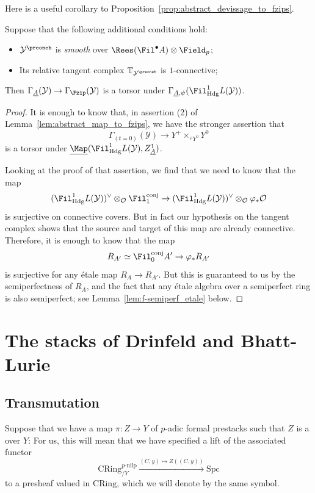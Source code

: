 \documentclass[10pt]{amsart}
\begin{document}
Here is a useful corollary to Proposition~\ref{prop:abstract_devissage_to_fzips}.
\begin{corollary}
\label{cor:abstract_fzip_smooth_torsor}
Suppose that the following additional conditions hold:
\begin{itemize}
   \item $\mathcal{Y}^\preoneb$ is \emph{smooth} over $\Rees(\Fil^\bullet A)\otimes\Field_p$;
   \item Its relative tangent complex $\mathbb{T}_{\mathcal{Y}^\preoneb}$ is $1$-connective;
\end{itemize}
Then $\Gamma_{\underline{A}}(\mathcal{Y})\to \Gamma_{\Fzip}(\mathcal{Y})$ is a torsor under $\Gamma_{\underline{A},\psi}(\Fil^1_{\mathrm{Hdg}}L(\mathcal{Y}))$.
\end{corollary}   
\begin{proof}
It is enough to know that, in assertion (2) of Lemma~\ref{lem:abstract_map_to_fzips}, we have the stronger assertion that
\[
\Gamma_{(t=0)}(\mathcal{Y})\to Y^+\times_{{}^\varphi Y^0}Y^0
\]
is a torsor under $\underline{\Map}(\Fil^1_{\mathrm{Hdg}}L(\mathcal{Y}),Z^1_{\underline{A}})$.

Looking at the proof of that assertion, we find that we need to know that the map
\[
(\Fil^1_{\mathrm{Hdg}}L(\mathcal{Y}))^\vee\otimes_{\mathcal{O}}\Fil^{\mathrm{conj}}_1\to (\Fil^1_{\mathrm{Hdg}}L(\mathcal{Y}))^\vee\otimes_{\mathcal{O}}\varphi_*\mathcal{O}
\]
is surjective on connective covers. But in fact our hypothesis on the tangent complex shows that the source and target of this map are already connective. Therefore, it is enough to know that the map
\[
R_{A'}\simeq \Fil^{\mathrm{conj}}_0A'\to \varphi_*R_{A'}
\]
is surjective for any \'etale map $R_A\to R_{A'}$. But this is guaranteed to us by the semiperfectness of $R_A$, and the fact that any \'etale algebra over a semiperfect ring is also semiperfect; see Lemma~\ref{lem:f-semiperf_etale} below.
\end{proof}


\section{The stacks of Drinfeld and Bhatt-Lurie}
\label{sec:bld_stacks}


\subsection{Transmutation}
\label{subsec:transmutation}

Suppose that we have a map $\pi:Z\to Y$ of $p$-adic formal prestacks such that $Z$ is a  over $Y$: For us, this will mean that we have specified a lift of the associated functor
\[
\mathrm{CRing}^{p\text{-nilp}}_{/Y}\xrightarrow{(C,y)\mapsto Z((C,y))}\mathrm{Spc}
\]
to a presheaf valued in $\mathrm{CRing}$, which we will denote by the same symbol. 
\end{document}
